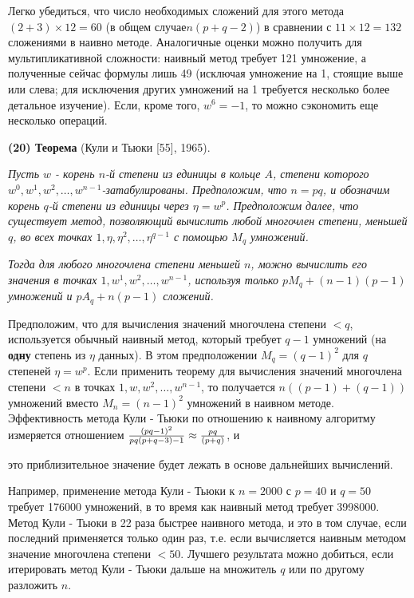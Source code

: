 \documentclass{mai_book}
\begin{document}
	Легко убедиться, что число необходимых сложений для этого метода $(2+3) \times 12 = 60$ (в общем случае$n(p+q-2)$) в сравнении с $11 \times 12 = 132$ сложениями в наивно методе. Аналогичные оценки можно получить для мультипликативной сложности: наивный метод требует 121 умножение, а полученные сейчас формулы лишь 49 (исключая умножение на 1, стоящие выше или слева; для исключения других умножений на 1 требуется несколько более детальное изучение). Если, кроме того, $w^6=-1$, то можно сэкономить еще несколько операций.
	
	\medskip
	
	{\bf (20) Теорема} (Кули и Тьюки [55], 1965).
	
	\smallskip
	
	\textit{Пусть $w$ - корень $n$-й степени из единицы в кольце $A$, степени которого $w^0,w^1,w^2,\dots,w^{n-1}$-затабулированы. Предположим, что $n=pq$, и обозначим корень $q$-й степени из единицы через $\eta = w^p$. Предположим далее, что существует метод, позволяющий вычислить любой многочлен степени, меньшей $q$, во всех точках $1,\eta,\eta^2,\ldots,\eta^{q-1}$ с помощью $M_q$ умножений.}
	
	\textit{Тогда для любого многочлена степени меньшей $n$, можно вычислить его значения в точках $1,w^1,w^2,\ldots,w^{n-1}$, используя только $pM_q+(n-1)(p-1)$ умножений и $pA_{q}+n(p-1)$ сложений.}
	
	\medskip
	
	
	\smallskip
	
	Предположим, что для вычисления значений многочлена степени $< q$, используется обычный наивный метод, который требует $q-1$ умножений (на 
	{\bf одну} степень из $\eta$ данных). В этом предположении $M_q = (q-1)^2$ для $q$ степеней $\eta = w^p$. Если применить теорему для вычисления значений многочлена степени $< n$ в точках $1,w,w^2,\ldots,w^{n-1}$, то получается $n((p-1)+(q-1))$ умножений вместо $M_n = (n-1)^2$ умножений в наивном методе. Эффективность метода Кули - Тьюки по отношению к наивному алгоритму измеряется отношением ${(pq-1)^2 \over {pq(p+q-3)-1}} \approx {pq \over (p+q)}$, и
	
	
	\newpage
	
	
	\noindent это приблизительное значение будет лежать в основе дальнейших вычислений.
	
	Например, применение метода Кули - Тьюки к $n = 2000$ с $p = 40$ и $q = 50$ требует 176000 умножений, в то время как наивный метод требует 3998000. Метод Кули - Тьюки в 22 раза быстрее наивного метода, и это в том случае, если последний применяется только один раз, т.е. если вычисляется наивным методом значение многочлена степени $< 50$. Лучшего результата можно добиться, если итерировать метод Кули - Тьюки дальше на множитель $q$ или по другому разложить $n$.
	
\end{document}
